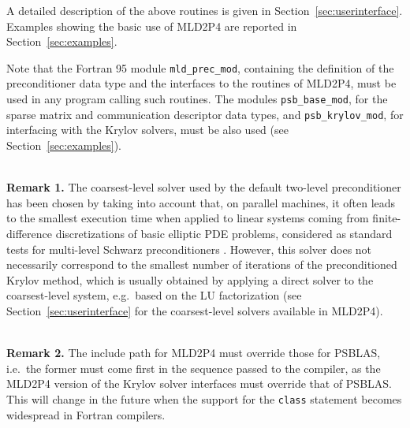 A detailed description of the above routines is given in Section~\ref{sec:userinterface}.
Examples showing the basic use of MLD2P4 are reported in Section~\ref{sec:examples}.

Note that the Fortran 95 module \verb|mld_prec_mod|, containing the definition of the 
preconditioner data type and the interfaces to the routines of MLD2P4,
must be used in any program calling such routines.
The modules \verb|psb_base_mod|, for the sparse matrix and communication descriptor
data types, and \verb|psb_krylov_mod|, for interfacing with the
Krylov solvers, must be also used (see Section~\ref{sec:examples}).

\ \\
\textbf{Remark 1.} The coarsest-level solver used by the default two-level
preconditioner has been chosen by taking into account that, on parallel
machines, it often leads to the smallest execution time when applied to
linear systems coming from finite-difference discretizations of basic
elliptic PDE problems, considered as standard tests for multi-level Schwarz
preconditioners \cite{aaecc_07,apnum_07}. However, this solver does
not necessarily correspond to the smallest number of iterations of the
preconditioned Krylov method, which is usually obtained by applying
a direct solver to the coarsest-level system, e.g.\ based on the LU
factorization (see Section~\ref{sec:userinterface}
for the coarsest-level solvers available in MLD2P4). 

\ \\
\textbf{Remark 2.} The include path for MLD2P4 must override
those for PSBLAS, i.e.\ the former must come first in the sequence
passed to the compiler, as the MLD2P4 version of the Krylov solver
interfaces must override that of PSBLAS. This will change in the future
when the support for the \verb|class| statement becomes widespread in Fortran
compilers. 


